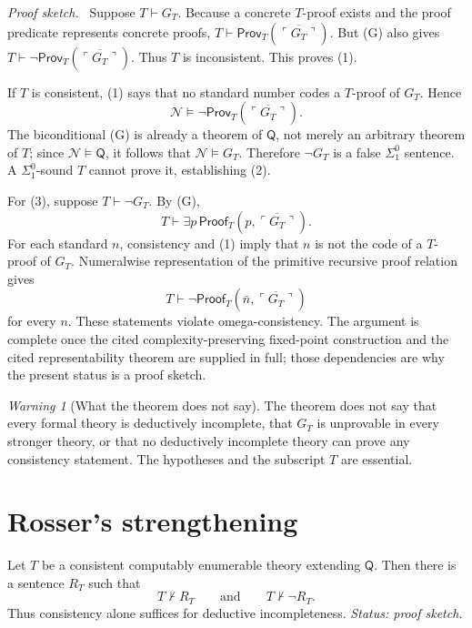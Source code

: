 \documentclass[11pt,oneside,openany]{book}
\theoremstyle{definition}
\theoremstyle{plain}
\newtheorem{theorem}[definition]{Theorem}
\theoremstyle{remark}
\newtheorem{warning}[definition]{Warning}
\let\LogicTheorem\theorem
\let\endLogicTheorem\endtheorem
\renewenvironment{theorem}[1][]{%
  \LogicTheorem[#1]%
  \if\relax\detokenize{#1}\relax\else\index{#1}\fi
}{\endLogicTheorem}
\newenvironment{proofplan}{\par\noindent\textit{Proof sketch.}\ }{\par}
\newcommand{\entails}{\models}
\newcommand{\derives}{\vdash}
\newcommand{\notderives}{\not\vdash}
\begin{document}
\begin{proofplan}
Suppose \(T\derives G_T\).  Because a concrete \(T\)-proof exists and the
proof predicate represents concrete proofs,
\(T\derives\mathsf{Prov}_T(\overline{\ulcorner G_T\urcorner})\).  But (G)
also gives
\(T\derives\neg\mathsf{Prov}_T(\overline{\ulcorner G_T\urcorner})\).
Thus \(T\) is inconsistent.  This proves (1).

If \(T\) is consistent, (1) says that no standard number codes a
\(T\)-proof of \(G_T\).  Hence
\[
  \mathcal N\entails
  \neg\mathsf{Prov}_T(\overline{\ulcorner G_T\urcorner}).
\]
The biconditional (G) is already a theorem of \(\mathsf Q\), not merely an
arbitrary theorem of \(T\); since \(\mathcal N\entails\mathsf Q\), it follows
that \(\mathcal N\entails G_T\).
Therefore \(\neg G_T\) is a false \(\Sigma^0_1\) sentence.  A
\(\Sigma^0_1\)-sound \(T\) cannot prove it, establishing (2).

For (3), suppose \(T\derives\neg G_T\).  By (G),
\[
  T\derives\exists p\,
  \mathsf{Proof}_T(p,\overline{\ulcorner G_T\urcorner}).
\]
For each standard \(n\), consistency and (1) imply that \(n\) is not the code
of a \(T\)-proof of \(G_T\).  Numeralwise representation of the primitive
recursive proof relation gives
\[
  T\derives\neg
  \mathsf{Proof}_T(\bar n,\overline{\ulcorner G_T\urcorner})
\]
for every \(n\).  These statements violate omega-consistency.
The argument is complete once the cited complexity-preserving fixed-point
construction and the cited representability theorem are supplied in full;
those dependencies are why the present status is a proof sketch.
\end{proofplan}

\begin{warning}[What the theorem does not say]
The theorem does not say that every formal theory is deductively incomplete,
that \(G_T\) is unprovable in every stronger theory, or that no deductively
incomplete theory can prove any consistency statement.  The hypotheses and
the subscript \(T\) are essential.
\end{warning}

\section{Rosser's strengthening}
\label{sec:first-incompleteness-04}

\begin{theorem}[Rosser]
\label{thm:rosser}
Let \(T\) be a consistent computably enumerable theory extending \(\mathsf Q\).
Then there is
a sentence \(R_T\) such that
\[
  T\notderives R_T
  \qquad\text{and}\qquad
  T\notderives\neg R_T.
\]
Thus consistency alone suffices for deductive incompleteness.
\textit{Status: proof sketch.}
\end{theorem}
\end{document}
